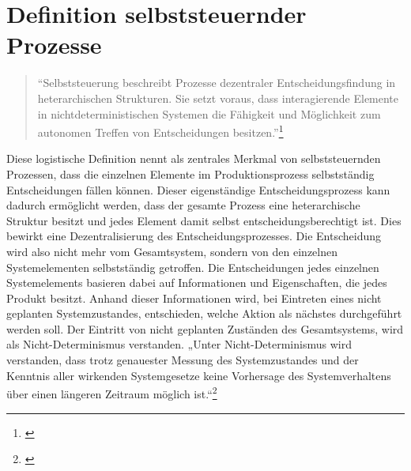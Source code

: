 \section{Definition selbststeuernder Prozesse}
\label{sec:Definition}

\begin{quote}
“Selbststeuerung beschreibt Prozesse dezentraler Entscheidungsfindung in
heterarchischen Strukturen. Sie setzt voraus, dass interagierende Elemente in
nichtdeterministischen Systemen die Fähigkeit und Möglichkeit zum autonomen
Treffen von Entscheidungen besitzen.”\footnote{\citet[S.~42]{huelsmann2005}}
\end{quote}

Diese logistische Definition nennt als zentrales Merkmal von selbststeuernden
Prozessen, dass die einzelnen Elemente im Produktionsprozess selbstständig
Entscheidungen fällen können. Dieser eigenständige Entscheidungsprozess kann
dadurch ermöglicht werden, dass der gesamte Prozess eine heterarchische Struktur
besitzt und jedes Element damit selbst entscheidungsberechtigt ist. Dies bewirkt
eine Dezentralisierung des Entscheidungsprozesses. Die Entscheidung wird also
nicht mehr vom Gesamtsystem, sondern von den einzelnen Systemelementen
selbstständig getroffen. Die Entscheidungen jedes einzelnen Systemelements
basieren dabei auf Informationen und Eigenschaften, die jedes Produkt besitzt.
Anhand dieser Informationen wird, bei Eintreten eines nicht geplanten
Systemzustandes, entschieden, welche Aktion als nächstes durchgeführt werden
soll. Der Eintritt von nicht geplanten Zuständen des Gesamtsystems, wird als
Nicht-Determinismus verstanden. „Unter Nicht-Determinismus wird verstanden, dass
trotz genauester Messung des Systemzustandes und der Kenntnis aller wirkenden
Systemgesetze keine Vorhersage des Systemverhaltens über einen längeren
Zeitraum möglich ist.“\footnote{\citet[S.~10]{boese2012}}
 